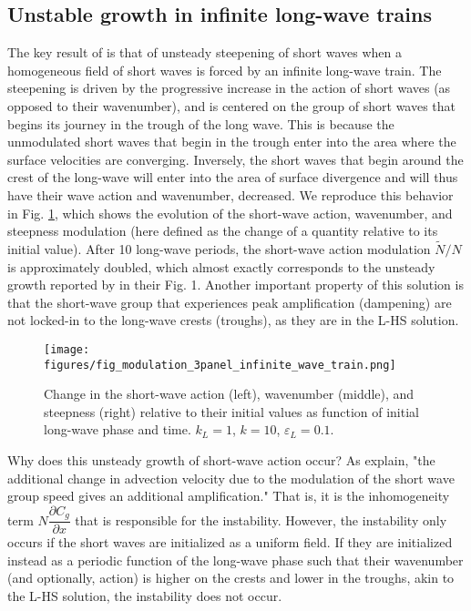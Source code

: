 \documentclass[draft]{agujournal2019}
\begin{document}
\subsection{Unstable growth in infinite long-wave trains}
\label{subsection:unstable_growth}

The key result of  is that of unsteady steepening of
short waves when a homogeneous field of short waves is forced by an infinite
long-wave train.
The steepening is driven by the progressive increase in the action of short
waves (as opposed to their wavenumber), and is centered on the group of short
waves that begins its journey in the trough of the long wave.
This is because the unmodulated short waves that begin in the trough enter into
the area where the surface velocities are converging.
Inversely, the short waves that begin around the crest of the long-wave will
enter into the area of surface divergence and will thus have their wave action
and wavenumber, decreased.
We reproduce this behavior in Fig. \ref{fig:modulation_3panel_infinite}, which
shows the evolution of the short-wave action, wavenumber, and steepness
modulation (here defined as the change of a quantity relative to its initial value).
After 10 long-wave periods, the short-wave action modulation $\widetilde{N}/N$
is approximately doubled, which almost exactly corresponds to the unsteady growth
reported by  in their Fig. 1.
Another important property of this solution is that the short-wave group that
experiences peak amplification (dampening) are not locked-in to the long-wave
crests (troughs), as they are in the L-HS solution.

\begin{figure}[h]
\label{fig:modulation_3panel_infinite}
\centering
\texttt{[image: figures/fig\_modulation\_3panel\_infinite\_wave\_train.png]}
\caption{
  Change in the short-wave action (left), wavenumber (middle), and steepness (right)
  relative to their initial values as function of initial long-wave phase and time.
  $k_L = 1$, $k = 10$, $\varepsilon_L = 0.1$.
}
\end{figure}

Why does this unsteady growth of short-wave action occur?
As  explain, "the additional change in advection
velocity due to the modulation of the short wave group speed gives an additional
amplification."
That is, it is the inhomogeneity term $N \dfrac{\partial C_g}{\partial x}$ that
is responsible for the instability.
However, the instability only occurs if the short waves are initialized as a
uniform field.
If they are initialized instead as a periodic function of the long-wave phase
such that their wavenumber (and optionally, action) is higher on the crests
and lower in the troughs, akin to the L-HS solution, the instability does not
occur.
\end{document}
